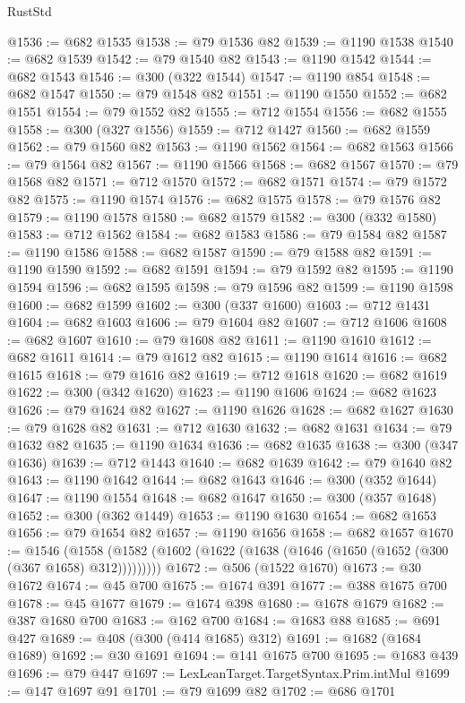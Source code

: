 \begin{lexlean}{RustStd}
\begin{coremodule}
{\begin{coremodule}
{{{{{{{{{{{{{{{{{{{{{{{{{{{{{{{@1536 := @682 @1535
@1538 := @79 @1536 @82
@1539 := @1190 @1538
@1540 := @682 @1539
@1542 := @79 @1540 @82
@1543 := @1190 @1542
@1544 := @682 @1543
@1546 := @300 (@322 @1544)
@1547 := @1190 @854
@1548 := @682 @1547
@1550 := @79 @1548 @82
@1551 := @1190 @1550
@1552 := @682 @1551
@1554 := @79 @1552 @82
@1555 := @712 @1554
@1556 := @682 @1555
@1558 := @300 (@327 @1556)
@1559 := @712 @1427
@1560 := @682 @1559
@1562 := @79 @1560 @82
@1563 := @1190 @1562
@1564 := @682 @1563
@1566 := @79 @1564 @82
@1567 := @1190 @1566
@1568 := @682 @1567
@1570 := @79 @1568 @82
@1571 := @712 @1570
@1572 := @682 @1571
@1574 := @79 @1572 @82
@1575 := @1190 @1574
@1576 := @682 @1575
@1578 := @79 @1576 @82
@1579 := @1190 @1578
@1580 := @682 @1579
@1582 := @300 (@332 @1580)
@1583 := @712 @1562
@1584 := @682 @1583
@1586 := @79 @1584 @82
@1587 := @1190 @1586
@1588 := @682 @1587
@1590 := @79 @1588 @82
@1591 := @1190 @1590
@1592 := @682 @1591
@1594 := @79 @1592 @82
@1595 := @1190 @1594
@1596 := @682 @1595
@1598 := @79 @1596 @82
@1599 := @1190 @1598
@1600 := @682 @1599
@1602 := @300 (@337 @1600)
@1603 := @712 @1431
@1604 := @682 @1603
@1606 := @79 @1604 @82
@1607 := @712 @1606
@1608 := @682 @1607
@1610 := @79 @1608 @82
@1611 := @1190 @1610
@1612 := @682 @1611
@1614 := @79 @1612 @82
@1615 := @1190 @1614
@1616 := @682 @1615
@1618 := @79 @1616 @82
@1619 := @712 @1618
@1620 := @682 @1619
@1622 := @300 (@342 @1620)
@1623 := @1190 @1606
@1624 := @682 @1623
@1626 := @79 @1624 @82
@1627 := @1190 @1626
@1628 := @682 @1627
@1630 := @79 @1628 @82
@1631 := @712 @1630
@1632 := @682 @1631
@1634 := @79 @1632 @82
@1635 := @1190 @1634
@1636 := @682 @1635
@1638 := @300 (@347 @1636)
@1639 := @712 @1443
@1640 := @682 @1639
@1642 := @79 @1640 @82
@1643 := @1190 @1642
@1644 := @682 @1643
@1646 := @300 (@352 @1644)
@1647 := @1190 @1554
@1648 := @682 @1647
@1650 := @300 (@357 @1648)
@1652 := @300 (@362 @1449)
@1653 := @1190 @1630
@1654 := @682 @1653
@1656 := @79 @1654 @82
@1657 := @1190 @1656
@1658 := @682 @1657
@1670 := @1546
    (@1558 (@1582 (@1602 (@1622 (@1638 (@1646 (@1650 (@1652 (@300 (@367 @1658) @312)))))))))
@1672 := @506 (@1522 @1670)
@1673 := @30 @1672
@1674 := @45 @700
@1675 := @1674 @391
@1677 := @388 @1675 @700
@1678 := @45 @1677
@1679 := @1674 @398
@1680 := @1678 @1679
@1682 := @387 @1680 @700
@1683 := @162 @700
@1684 := @1683 @88
@1685 := @691 @427
@1689 := @408 (@300 (@414 @1685) @312)
@1691 := @1682 (@1684 @1689)
@1692 := @30 @1691
@1694 := @141 @1675 @700
@1695 := @1683 @439
@1696 := @79 @447
@1697 := LexLeanTarget.TargetSyntax.Prim.intMul
@1699 := @147 @1697 @91
@1701 := @79 @1699 @82
@1702 := @686 @1701
}}}}}}}}}}}}}}}}}}}}}}}}}}}}}}}
\end{coremodule}}
\end{coremodule}
\end{lexlean}
